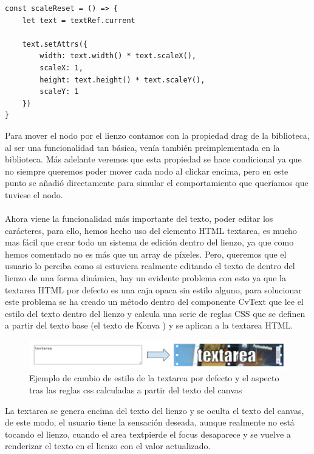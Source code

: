 \newpage

\begin{lstlisting}[caption={Sobrecarga del reescalado del nodo CvText}]
const scaleReset = () => {
    let text = textRef.current

    text.setAttrs({
        width: text.width() * text.scaleX(),
        scaleX: 1,
        height: text.height() * text.scaleY(),
        scaleY: 1
    })
}
\end{lstlisting}

Para mover el nodo por el lienzo contamos con la propiedad drag de la biblioteca, al ser
una funcionalidad tan básica, venía también preimplementada en la biblioteca.
Más adelante veremos que esta propiedad se hace condicional ya que no siempre queremos
poder mover cada nodo al clickar encima, pero en este punto se añadió directamente para
simular el comportamiento que queríamos que tuviese el nodo.
\\\\
Ahora viene la funcionalidad más importante del texto, poder editar los 
carácteres, para ello, hemos hecho uso del elemento HTML textarea, es mucho mas
fácil que crear todo un sistema de edición dentro del lienzo, ya que como hemos comentado
no es más que un array de píxeles. Pero, queremos que el usuario lo perciba como si estuviera
realmente editando el texto de dentro del lienzo de una forma dinámica,
hay un evidente problema con esto ya que la textarea HTML por defecto es una caja opaca
sin estilo alguno, para solucionar este problema se ha creado un método dentro del 
componente CvText que lee el estilo del texto dentro del lienzo y calcula una serie
de reglas CSS que se definen a partir del texto base (el texto de Konva \cite{KonvaJS})
y se aplican a la textarea HTML.

\begin{figure}[!h]
  \centering
    \includegraphics[scale=0.55]{img/textareadiff.png}
  \caption{Ejemplo de cambio de estilo de la textarea por defecto y el aspecto tras las reglas css calculadas a partir del texto del canvas}
\end{figure}

La textarea se genera encima del texto del lienzo y se oculta el texto del canvas,
de este modo, el usuario tiene la sensación deseada, aunque realmente no está tocando
el lienzo, cuando el area textpierde el focus desaparece y se vuelve a renderizar el 
texto en el lienzo con el valor actualizado.

